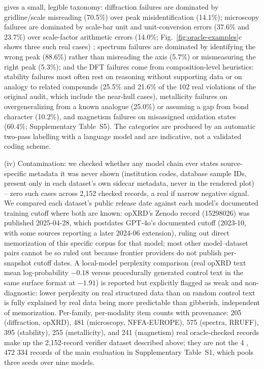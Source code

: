 \documentclass[pdflatex,sn-nature]{sn-jnl}
\newcommand{\rev}[1]{#1} %
\newcommand{\rev}[1]{{\color{blue}#1}} %
\providecommand{\DIFadd}[1]{{\protect\color{blue} \sf #1}} %
\providecommand{\DIFdel}[1]{{\protect\color{red} \scriptsize #1}} %
\providecommand{\DIFaddbegin}{} %
\providecommand{\DIFaddend}{} %
\providecommand{\DIFdelbegin}{} %
\providecommand{\DIFdelend}{} %
\providecommand{\DIFscaledelfig}{0.5}
\newlength{\DIFdelgraphicswidth} %
\newlength{\DIFdelgraphicsheight} %
\providecommand{\DIFaddincludegraphics}[2][]{{\color{blue}\fbox{\DIFOincludegraphics[#1]{#2}}}} %
\providecommand{\DIFdelincludegraphics}[2][]{%
\sbox{\DIFdelgraphicsbox}{\DIFOincludegraphics[#1]{#2}}%
\settoboxwidth{\DIFdelgraphicswidth}{\DIFdelgraphicsbox} %
\settoboxtotalheight{\DIFdelgraphicsheight}{\DIFdelgraphicsbox} %
\scalebox{\DIFscaledelfig}{%
\parbox[b]{\DIFdelgraphicswidth}{\usebox{\DIFdelgraphicsbox}\\[-\baselineskip] \rule{\DIFdelgraphicswidth}{0em}}\llap{\resizebox{\DIFdelgraphicswidth}{\DIFdelgraphicsheight}{%
\setlength{\unitlength}{\DIFdelgraphicswidth}%
\begin{picture}(1,1)%
\thicklines\linethickness{2pt} %
{\color[rgb]{1,0,0}\put(0,0){\framebox(1,1){}}}%
{\color[rgb]{1,0,0}\put(0,0){\line( 1,1){1}}}%
{\color[rgb]{1,0,0}\put(0,1){\line(1,-1){1}}}%
\end{picture}%
}\hspace*{3pt}}} %
} %
\DeclareRobustCommand{\DIFaddbegin}{\DIFOaddbegin \let\includegraphics\DIFaddincludegraphics} %
\DeclareRobustCommand{\DIFaddend}{\DIFOaddend \let\includegraphics\DIFOincludegraphics} %
\DeclareRobustCommand{\DIFdelbegin}{\DIFOdelbegin \let\includegraphics\DIFdelincludegraphics} %
\DeclareRobustCommand{\DIFdelend}{\DIFOaddend \let\includegraphics\DIFOincludegraphics} %
\begin{document}
gives a small, legible taxonomy: diffraction failures are dominated by gridline/scale
misreading (70.5\%) over peak misidentification (14.1\%); microscopy failures are
dominated by scale-bar unit and unit-conversion errors (37.6\% and 23.7\%) over scale-factor
arithmetic errors (14.0\%; Fig.~\ref{fig:oracle-examples}c shows three such real cases)\DIFaddbegin \DIFadd{\rev{; spectrum
failures are dominated by identifying the wrong peak (88.6\%) rather than misreading the axis (5.7\%)
or mismeasuring the right peak (5.3\%); and the DFT failures come from composition-level
heuristics: stability failures most often rest on reasoning without supporting data or on analogy to
related compounds (25.5\% and 21.6\% \rev{of the 102 real violations of the original audit, which include the
near-hull cases}), metallicity failures on overgeneralizing from a known analogue
(25.0\%) or assuming a gap from bond character (10.2\%), and magnetism failures on misassigned
oxidation states (60.4\%; Supplementary Table~S5). The categories are produced by an automatic two-pass labelling with a
language model and are indicative, not a validated coding scheme}}\DIFaddend .

(iv) Contamination: we checked whether any model chain ever
states source-specific metadata it was never shown (institution codes, database sample
IDs, present only in each dataset's own sidecar metadata, never in the rendered plot) --
zero such cases across 2{,}152 checked records, a real if narrow negative signal. We
compared each dataset's public release date against each model's documented training
cutoff where both are known: opXRD's Zenodo record (15298026) was published 2025-04-28,
which postdates GPT-4o's documented cutoff (2023-10, with some sources reporting a later
2024-06 extension), ruling out direct memorization of this specific corpus for that model;
most other model--dataset pairs cannot be so ruled out because frontier providers do not
publish per-snapshot cutoff dates. A local-model perplexity comparison (real opXRD text
mean log-probability $-0.18$ versus procedurally generated control text in the same surface
format at $-1.91$) is reported but explicitly flagged as weak and non-diagnostic: lower
perplexity on real structured data than on random control text is fully explained by real
data being more predictable than gibberish, independent of memorization. Per-family,
per-modality item counts with provenance: 205 (diffraction, opXRD), 481 (microscopy,
NFFA-EUROPE), 575 (spectra, RRUFF), 395 (stability), 255 (metallicity), and 241 (magnetism)
real oracle-checked records make up the 2{,}152-record verifier dataset described above;
they are not the \DIFdelbegin \DIFdel{4}%
\DIFdel{,}%
\DIFdel{472 }\DIFdelend \DIFaddbegin \DIFadd{\rev{4{,}334} }\DIFaddend records of the main evaluation in Supplementary Table~S1, which
pools three seeds over nine models.
\end{document}
